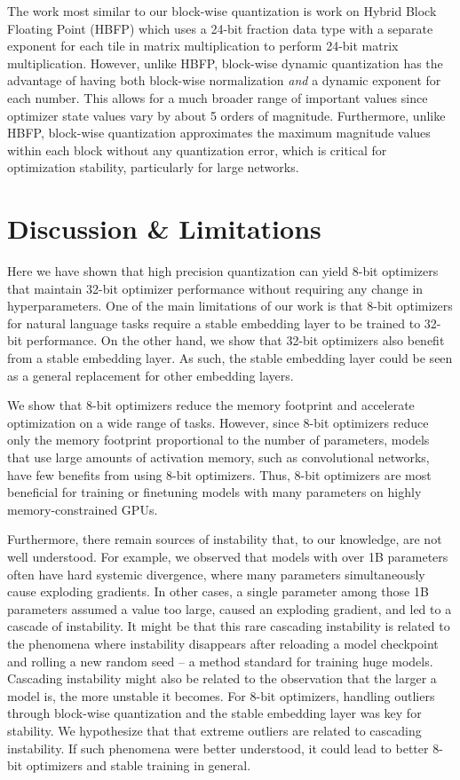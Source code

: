 The work most similar to our block-wise quantization is work on Hybrid Block Floating Point (HBFP) \citep{drumond2018hybridblock} which uses a 24-bit fraction data type with a separate exponent for each tile in matrix multiplication to perform 24-bit matrix multiplication. However, unlike HBFP, block-wise dynamic quantization has the advantage of having both block-wise normalization {\it and} a dynamic exponent for each number. This allows for a much broader range of important values since optimizer state values vary by about 5 orders of magnitude. Furthermore, unlike HBFP, block-wise quantization approximates the maximum magnitude values within each block without any quantization error, which is critical for optimization stability, particularly for large networks.

\section{Discussion \& Limitations}

Here we have shown that high precision quantization can yield 8-bit optimizers that maintain 32-bit optimizer performance without requiring any change in hyperparameters. One of the main limitations of our work is that 8-bit optimizers for natural language tasks require a stable embedding layer to be trained to 32-bit performance. On the other hand, we show that 32-bit optimizers also benefit from a stable embedding layer. As such, the stable embedding layer could be seen as a general replacement for other embedding layers.

We show that 8-bit optimizers reduce the memory footprint and accelerate optimization on a wide range of tasks. However, since 8-bit optimizers reduce only the memory footprint proportional to the number of parameters, models that use large amounts of activation memory, such as convolutional networks, have few benefits from using 8-bit optimizers. Thus, 8-bit optimizers are most beneficial for training or finetuning models with many parameters on highly memory-constrained GPUs.

Furthermore, there remain sources of instability that, to our knowledge, are not well understood. For example, we observed that models with over 1B parameters often have hard systemic divergence, where many parameters simultaneously cause exploding gradients. In other cases, a single parameter among those 1B parameters assumed a value too large, caused an exploding gradient, and led to a cascade of instability. It might be that this rare cascading instability is related to the phenomena where instability disappears after reloading a model checkpoint and rolling a new random seed -- a method standard for training huge models. Cascading instability might also be related to the observation that the larger a model is, the more unstable it becomes. For 8-bit optimizers, handling outliers through block-wise quantization and the stable embedding layer was key for stability. We hypothesize that that extreme outliers are related to cascading instability. If such phenomena were better understood, it could lead to better 8-bit optimizers and stable training in general.


